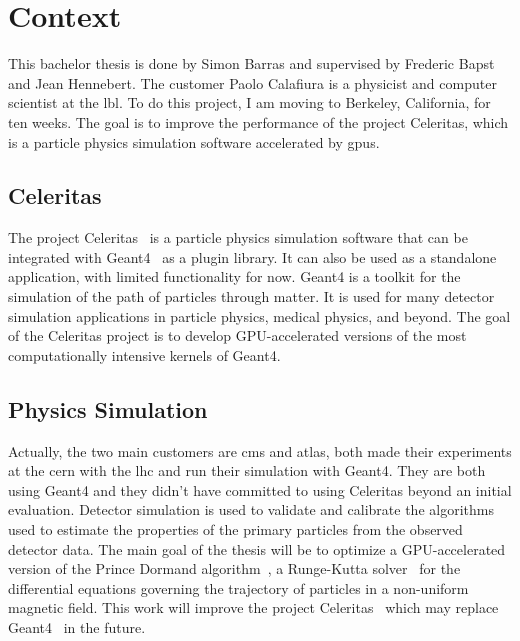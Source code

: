 \chapter{Context}
\label{spec:ch:context}

This bachelor thesis is done by Simon Barras and supervised by Frederic Bapst and Jean Hennebert.
The customer Paolo Calafiura is a physicist and computer scientist at the \acrfull{lbl}.
To do this project, I am moving to Berkeley, California, for ten weeks.
The goal is to improve the performance of the project Celeritas, which is a particle physics simulation software accelerated by \acrshort{gpu}s.




\section{Celeritas}
\label{spec:ch:context:celeritas}

The project Celeritas~\cite{Celeritas-Project} is a particle physics simulation software that can be integrated with Geant4~\cite{Geant4} as a plugin library.
It can also be used as a standalone application, with limited functionality for now.
Geant4 is a toolkit for the simulation of the path of particles through matter.
It is used for many detector simulation applications in particle physics, medical physics, and beyond.
The goal of the Celeritas project is to develop GPU-accelerated versions of the most computationally intensive kernels of Geant4.

\section{Physics Simulation}
\label{spec:ch:context:physics-simulation}

Actually, the two main customers are \acrshort{cms} and \acrshort{atlas}, both made their experiments at the \acrfull{cern} with the \acrfull{lhc} and run their simulation with Geant4.
They are both using Geant4 and they didn't have committed to using Celeritas beyond an initial evaluation.
Detector simulation is used to validate and calibrate the algorithms used to estimate the properties of the primary particles from the observed detector data.
The main goal of the thesis will be to optimize a GPU-accelerated version of the Prince Dormand algorithm~\cite{princeDormand}, a Runge-Kutta solver~\cite{Runge-Kutta-methods} for the differential equations governing the trajectory of particles in a non-uniform magnetic field.
This work will improve the project Celeritas~\cite{Celeritas-Project} which may replace Geant4~\cite{Geant4} in the future.

